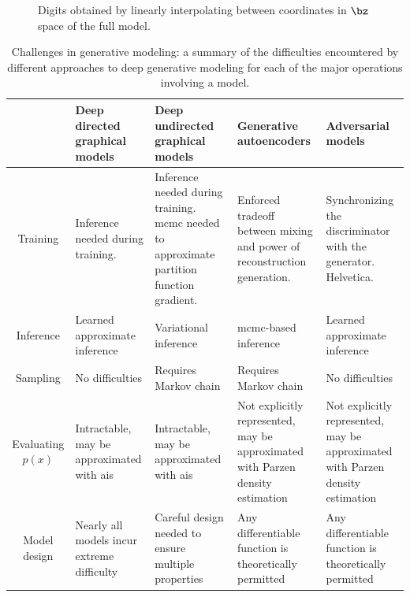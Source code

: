 \begin{figure}[!htb]
	\centering
	\caption{Digits obtained by linearly interpolating between coordinates in $\bz$ space of the full model.}
	\label{fig: figure 3}
\end{figure}

\begin{table}
	\renewcommand\tabularxcolumn[1]{m{#1}}
	\begin{tabularx}{\textwidth}{>{\raggedright}c|X|X|X|X}%
		& Deep directed graphical models & Deep undirected graphical models & Generative autoencoders & Adversarial models\\
		\hline
		Training & Inference needed during training. & Inference needed during training. \acrshort{mcmc} needed to approximate partition function gradient. & Enforced tradeoff between mixing and power of reconstruction generation. & Synchronizing the discriminator with the generator. Helvetica.\\
		\hline
		Inference & Learned approximate inference & Variational inference & \acrshort{mcmc}-based inference & Learned approximate inference\\
		\hline
		Sampling & No difficulties & Requires Markov chain & Requires Markov chain & No difficulties\\
		\hline
		Evaluating $p(x)$ & Intractable, may be approximated with \acrshort{ais} & Intractable, may be approximated with \acrshort{ais} & Not explicitly represented, may be approximated with Parzen density estimation & Not explicitly represented, may be approximated with Parzen density estimation\\
		\hline
		Model design & Nearly all models incur extreme difficulty & Careful design needed to ensure multiple properties & Any differentiable function is theoretically permitted & Any differentiable function is theoretically permitted\\
	\end{tabularx}
	\caption{Challenges in generative modeling: a summary of the difficulties encountered by different approaches to deep generative modeling for each of the major operations involving a model.}
	\label{tab: table 2}
\end{table}
